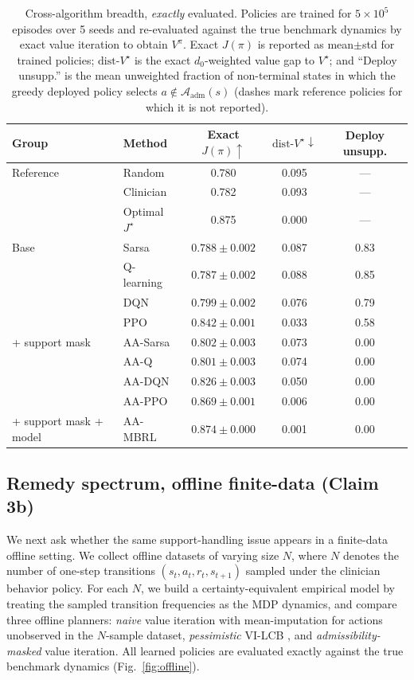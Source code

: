 \documentclass{article}
\newcommand{\Adm}{\mathcal{A}_{\mathrm{adm}}}
\newcommand{\dist}{\mathrm{dist}\text{-}V^\star}
\begin{document}
\begin{table}[t]
\centering
\caption{Cross-algorithm breadth, \emph{exactly} evaluated. Policies are trained
for $5{\times}10^5$ episodes over 5 seeds and re-evaluated against the true
benchmark dynamics by exact value iteration to obtain $V^\pi$. Exact $J(\pi)$ is
reported as mean${\pm}$std for trained policies; $\dist$ is the exact
$d_0$-weighted value gap to $V^\star$; and ``Deploy unsupp.'' is the mean
unweighted fraction of non-terminal states in which the greedy deployed policy
selects $a\notin\Adm(s)$ (dashes mark reference policies for which it is not
reported).}
\label{tab:merged}
\begin{tabular}{llccc}
\toprule
Group & Method & Exact $J(\pi)\uparrow$ & $\dist\downarrow$ & Deploy unsupp. \\
\midrule
Reference & Random            & 0.780 & 0.095 & --- \\
          & Clinician         & 0.782 & 0.093 & --- \\
          & Optimal $J^\star$ & 0.875 & 0.000 & --- \\
\midrule
Base      & Sarsa       & $0.788{\pm}0.002$ & 0.087 & 0.83 \\
          & Q-learning  & $0.787{\pm}0.002$ & 0.088 & 0.85 \\
          & DQN         & $0.799{\pm}0.002$ & 0.076 & 0.79 \\
          & PPO         & $0.842{\pm}0.001$ & 0.033 & 0.58 \\
\midrule
+ support mask & AA-Sarsa   & $0.802{\pm}0.003$ & 0.073 & 0.00 \\
          & AA-Q        & $0.801{\pm}0.003$ & 0.074 & 0.00 \\
          & AA-DQN      & $0.826{\pm}0.003$ & 0.050 & 0.00 \\
          & AA-PPO      & $0.869{\pm}0.001$ & 0.006 & 0.00 \\
\midrule
+ support mask + model & AA-MBRL & $0.874{\pm}0.000$ & 0.001 & 0.00 \\
\bottomrule
\end{tabular}
\end{table}

\subsection{Remedy spectrum, offline finite-data (Claim 3b)}
\label{sec:offline}

We next ask whether the same support-handling issue appears in a finite-data
offline setting. We collect offline datasets of varying size $N$, where $N$
denotes the number of one-step transitions $(s_t,a_t,r_t,s_{t+1})$ sampled under
the clinician behavior policy. For each $N$, we build a certainty-equivalent
empirical model by treating the sampled transition frequencies as the MDP
dynamics, and compare three offline planners: \emph{naive} value iteration
with mean-imputation for actions unobserved in the $N$-sample dataset,
\emph{pessimistic} VI-LCB
\citep{jin2021pessimism,rashidinejad2021pessimism}, and
\emph{admissibility-masked} value iteration. All learned policies are evaluated
exactly against the true benchmark dynamics (Fig.~\ref{fig:offline}).
\end{document}
